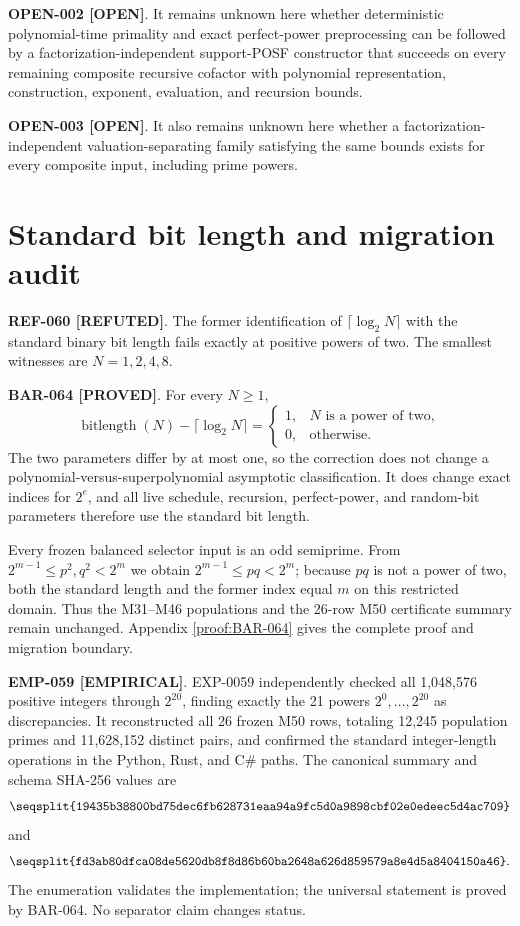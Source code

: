 \documentclass[11pt]{article}
\newcommand{\claimstatus}[2]{\textbf{#1 [#2]}}
\begin{document}
\claimstatus{OPEN-002}{OPEN}. It remains unknown here whether deterministic
polynomial-time primality and exact perfect-power preprocessing can be followed
by a factorization-independent support-POSF constructor that succeeds on every
remaining composite recursive cofactor with polynomial representation,
construction, exponent, evaluation, and recursion bounds.

\claimstatus{OPEN-003}{OPEN}. It also remains unknown here whether a
factorization-independent valuation-separating family satisfying the same
bounds exists for every composite input, including prime powers.

\section{Standard bit length and migration audit}

\claimstatus{REF-060}{REFUTED}. The former identification of
\(\lceil\log_2N\rceil\) with the standard binary bit length fails exactly at
positive powers of two. The smallest witnesses are \(N=1,2,4,8\).

\claimstatus{BAR-064}{PROVED}. For every \(N\ge1\),
\[
\operatorname{bitlength}(N)-\lceil\log_2N\rceil
=
\begin{cases}
1,&N\text{ is a power of two},\\
0,&\text{otherwise}.
\end{cases}
\]
The two parameters differ by at most one, so the correction does not change a
polynomial-versus-superpolynomial asymptotic classification. It does change
exact indices for \(2^e\), and all live schedule, recursion, perfect-power,
and random-bit parameters therefore use the standard bit length.

Every frozen balanced selector input is an odd semiprime. From
\(2^{m-1}\le p^2,q^2<2^m\) we obtain
\(2^{m-1}\le pq<2^m\); because \(pq\) is not a power of two, both the standard
length and the former index equal \(m\) on this restricted domain. Thus the
M31--M46 populations and the 26-row M50 certificate summary remain unchanged.
Appendix \ref{proof:BAR-064} gives the complete proof and migration boundary.

\claimstatus{EMP-059}{EMPIRICAL}. EXP-0059 independently checked all
1,048,576 positive integers through \(2^{20}\), finding exactly the 21 powers
\(2^0,\ldots,2^{20}\) as discrepancies. It reconstructed all 26 frozen M50
rows, totaling 12,245 population primes and 11,628,152 distinct pairs, and
confirmed the standard integer-length operations in the Python, Rust, and
C\# paths. The canonical summary and schema SHA-256 values are
\[
\texttt{\seqsplit{19435b38800bd75dec6fb628731eaa94a9fc5d0a9898cbf02e0edeec5d4ac709}}
\]
and
\[
\texttt{\seqsplit{fd3ab80dfca08de5620db8f8d86b60ba2648a626d859579a8e4d5a8404150a46}}.
\]
The enumeration validates the implementation; the universal statement is
proved by BAR-064. No separator claim changes status.
\end{document}
